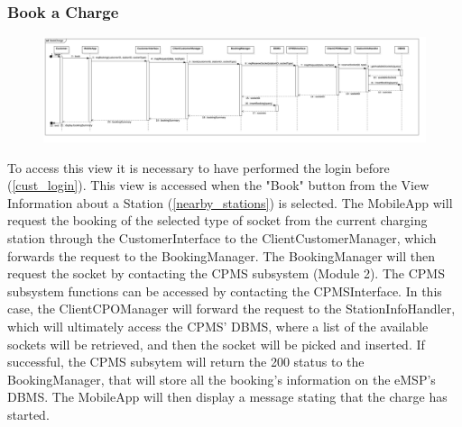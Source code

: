 \subsubsection{Book a Charge}\label{book_charge}
\begin{figure}[H]
    \begin{center}
        \includegraphics[width=\textwidth]{img/runtime/book_charge}
    \end{center}
\end{figure}
To access this view it is necessary to have performed the login before (\ref{cust_login}). This view is accessed when the "Book" button from the View Information about a Station (\ref{nearby_stations}) is selected. The MobileApp will request the booking of the selected type of socket from the current charging station through the CustomerInterface to the ClientCustomerManager, which forwards the request to the BookingManager. The BookingManager will then request the socket by contacting the CPMS subsystem (Module 2). The CPMS subsystem functions can be accessed by contacting the CPMSInterface. In this case, the ClientCPOManager will forward the request to the StationInfoHandler, which will ultimately access the CPMS' DBMS, where a list of the available sockets will be retrieved, and then the socket will be picked and inserted. If successful, the CPMS subsytem will return the 200 status to the BookingManager, that will store all the booking's information on the eMSP's DBMS. The MobileApp will then display a message stating that the charge has started.
